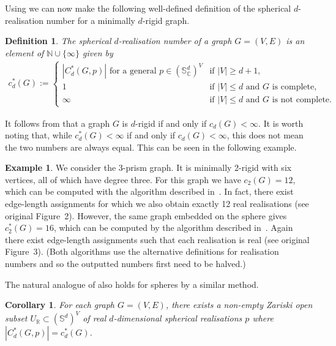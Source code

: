 \documentclass[11pt]{article}
\newtheorem{corollary}[theo]{Corollary}
\newtheorem{definition}[theo]{Definition}
\theoremstyle{definition}
\newtheorem{example}[theo]{Example}
\numberwithin{equation}{section}
\begin{document}
Using  we can now make the following well-defined definition of the spherical $d$-realisation number for a minimally $d$-rigid graph.

\begin{definition}\label{def:countsphere}
	The \emph{spherical $d$-realisation number} of a graph $G=(V,E)$ is an element of $\mathbb{N} \cup \{\infty\}$ given by
	\begin{align*}
		c^*_d(G) :=		
		\begin{cases}
			|C^*_d(G,p)| \text{ for a general $p \in (\mathbb{S}_\mathbb{C}^d)^V$} &\text{if } |V| \geq d+1, \\
			 1 &\text{if } |V| \leq d \text{ and $G$ is complete}, \\
			 \infty &\text{if } |V| \leq d \text{ and $G$ is not complete}.
		\end{cases}
	\end{align*}
\end{definition}

It follows from  that a graph $G$ is $d$-rigid if and only if $c_d(G) < \infty$.
It is worth noting that,
while $c^*_d(G) < \infty$ if and only if $c_d(G) < \infty$,
this does not mean the two numbers are always equal.
This can be seen in the following example.

\begin{example}
  We consider the 3-prism graph.
  It is minimally 2-rigid with six vertices, all of which have degree three.
  For this graph we have $c_2(G)=12$, which can be computed with the algorithm described in~\cite{PlaneCount}.
  In fact, there exist edge-length assignments for which we also obtain exactly 12 real realisations (see original Figure~2).
  However, the same graph embedded on the sphere gives $c_2^*(G)=16$,
  which can be computed by the algorithm described in~\cite{SphereCount}.
  Again there exist edge-length assignments such that each realisation is real (see original Figure~3).
  (Both algorithms use the alternative definitions for realisation numbers and so the outputted numbers first need to be halved.)
\end{example}

The natural analogue of  also holds for spheres by a similar method.

\begin{corollary}\label{cor:sphrealstuff}
	For each graph $G=(V,E)$,
	there exists a non-empty Zariski open subset $U_\mathbb{R} \subset (\mathbb{S}^d)^V$ of real $d$-dimensional spherical realisations $p$ where $|C^*_d(G,p)| = c^*_d(G)$.
\end{corollary}
\end{document}
